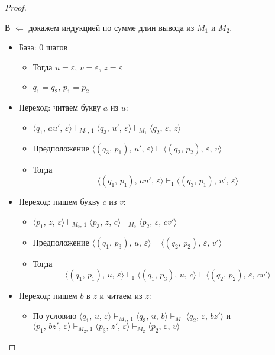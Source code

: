 \documentclass[a4paper,12pt]{article}
\theoremstyle{plain}
\theoremstyle{definition}
\theoremstyle{remark}
\begin{document}
\begin{proof}
\begin{itemize}
	\end{itemize}
	В $\Leftarrow$ докажем индукцией по сумме длин вывода из $M_1$ и $M_2$.
	\begin{itemize}
		\item База: 0 шагов
		      \begin{itemize}
			      \item Тогда $u = \varepsilon,\, v = \varepsilon,\, z = \varepsilon$
			      \item $q_1 = q_2,\, p_1 = p_2$
		      \end{itemize}
		\item Переход: читаем букву $a$ из $u$:
		      \begin{itemize}
			      \item $\langle q_1,\,au',\,\varepsilon\rangle\vdash_{M_1,\,1}\langle q_3,\,u',\,\varepsilon\rangle\vdash_{M_1}\langle q_2,\,\varepsilon,\,z\rangle$
			      \item Предположение $\langle(q_3,\,p_1),\,u',\,\varepsilon\rangle \vdash \langle(q_2,\,p_2),\,\varepsilon,\,v\rangle$
			      \item Тогда
			            \[
				            \langle(q_1,\,p_1),\,au',\,\varepsilon\rangle\vdash_1\langle(q_3,\,p_1),\,u',\,\varepsilon\rangle
			            \]
		      \end{itemize}
		\item Переход: пишем букву $c$ из $v$:
		      \begin{itemize}
			      \item $\langle p_1,\,z,\,\varepsilon\rangle\vdash_{M_2,\,1}\langle p_3,\,z,\,c\rangle\vdash_{M_2}\langle p_2,\,\varepsilon,\,cv'\rangle$
			      \item Предположение $\langle(q_1,\,p_3),\,u,\,\varepsilon\rangle\vdash\langle(q_2,\,p_2),\,\varepsilon,\,v'\rangle$
			      \item Тогда
			            \[
				            \langle(q_1,\,p_1),\,u,\,\varepsilon\rangle\vdash_1\langle(q_1,\,p_3),\,u,\,c\rangle\vdash\langle(q_2,\,p_2),\,\varepsilon,\,cv'\rangle
			            \]
		      \end{itemize}
		\item Переход: пишем $b$ в $z$ и читаем из $z$:
		      \begin{itemize}
			      \item По условию $\langle q_1,\,u,\,\varepsilon\rangle\vdash_{M_1,\,1}\langle q_3,\,u,\,b\rangle\vdash_{M_1}\langle q_2,\,\varepsilon,\, bz'\rangle$ и $\langle p_1,\,bz',\,\varepsilon\rangle\vdash_{M_2,\,1}\langle p_3,\,z',\,\varepsilon\rangle\vdash_{M_2}\langle p_2,\,\varepsilon,\,v\rangle$

\end{itemize}
\end{itemize}
\end{proof}
\end{document}
